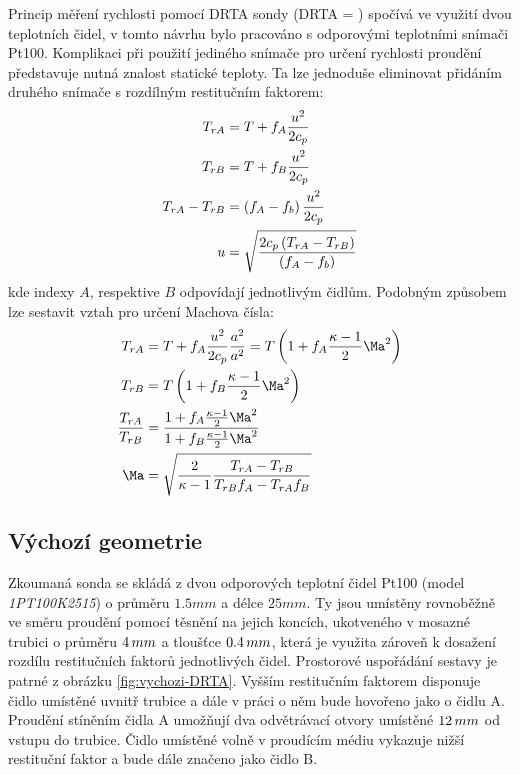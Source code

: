         Princip měření rychlosti pomocí DRTA sondy (DRTA = ) spočívá ve využití dvou teplotních čidel, v tomto návrhu bylo pracováno s odporovými teplotními snímači Pt100. Komplikaci při použití jediného snímače pro určení rychlosti proudění představuje nutná znalost statické teploty. Ta lze jednoduše eliminovat přidáním druhého snímače s rozdílným restitučním faktorem:
        \begin{align}
            T_{rA} &= T + f_A \frac{u^2}{2 c_p} \\
            T_{rB} &= T + f_B \frac{u^2}{2 c_p} \\
            T_{rA} - T_{rB} &= \left( f_A - f_b \right) \frac{u^2}{2 c_p} \\
            u &= \sqrt{\frac{2 c_p \left( T_{rA} - T_{rB} \right)}{\left( f_A - f_b \right)}} \label{eq:mereni-rychlosti}             
        \end{align}
        \noindent kde indexy $A$, respektive $B$ odpovídají jednotlivým čidlům. Podobným způsobem lze sestavit vztah pro určení Machova čísla:
        \begin{align}
            T_{rA} &= T + f_A \frac{u^2}{2 c_p} \frac{a^2}{a^2} = T \brac{1 + f_A \frac{\kappa - 1}{2} \Ma ^2} \\
            T_{rB} &=  T \brac{1 + f_B \frac{\kappa - 1}{2} \Ma ^2} \\
            \frac{T_{rA}}{T_{rB}} &= \frac{1 + f_A \frac{\kappa - 1}{2} \Ma ^2}{1 + f_B \frac{\kappa - 1}{2} \Ma ^2} \\
            \Ma &= \sqrt{\frac{2}{\kappa - 1} \frac{T_{rA}-T_{rB}}{T_{rB} f_A - T_{rA} f_B}}
        \end{align}

    \subsection{Výchozí geometrie}
        Zkoumaná sonda se skládá z dvou odporových teplotní čidel Pt100 (model \textit{1PT100K2515}) o průměru $1.5 \unit{mm}$ a délce $25 \unit{mm}$. Ty jsou umístěny rovnoběžně ve směru proudění pomocí těsnění na jejich koncích, ukotveného v mosazné trubici o průměru $4 \, mm$ a tloušťce $0.4 \, mm$, která je využita zároveň k dosažení rozdílu restitučních faktorů jednotlivých čidel. Prostorové uspořádání sestavy je patrné z obrázku \ref{fig:vychozi-DRTA}. Vyšším restitučním faktorem disponuje čidlo umístěné uvnitř trubice a dále v práci o něm bude hovořeno jako o čidlu A. Proudění stíněním čidla A umožňují dva odvětrávací otvory umístěné $12 \, mm$ od vstupu do trubice. Čidlo umístěné volně v proudícím médiu vykazuje nižší restituční faktor a bude dále značeno jako čidlo B.
        
